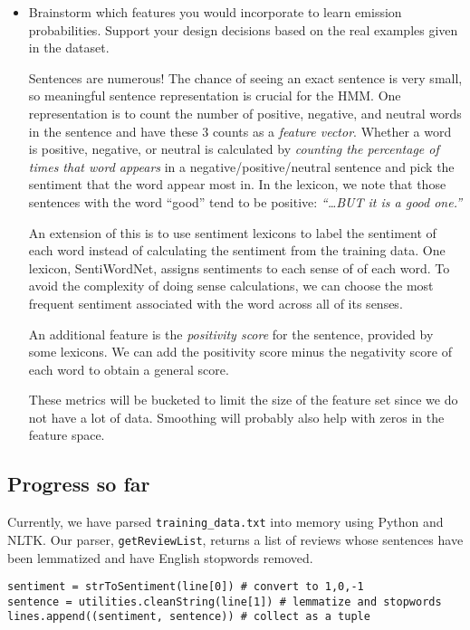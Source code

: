 \documentclass{article}
\begin{document}
\begin{itemize}
\item Brainstorm which features you would incorporate to learn emission probabilities. Support your design decisions based on the real examples given in the dataset.\par

Sentences are numerous! The chance of seeing an exact sentence is very small, so meaningful sentence representation is crucial for the HMM. One representation is to count the number of positive, negative, and neutral words in the sentence and have these 3 counts as a \emph{feature vector}. Whether a word is positive, negative, or neutral is calculated by \emph{counting the percentage of times that word appears} in a negative/positive/neutral sentence and pick the sentiment that the word appear most in. In the lexicon, we note that those sentences with the word ``good'' tend to be positive: \emph{``\ldots BUT it is a good one.''}

An extension of this is to use sentiment lexicons to label the sentiment of each word instead of calculating the sentiment from the training data. One lexicon, SentiWordNet, assigns sentiments to each sense of of each word. To avoid the complexity of doing sense calculations, we can choose the most frequent sentiment associated with the word across all of its senses.

An additional feature is the \emph{positivity score} for the sentence, provided by some lexicons. We can add the positivity score minus the negativity score of each word to obtain a general score.

These metrics will be bucketed to limit the size of the feature set since we do not have a lot of data. Smoothing will probably also help with zeros in the feature space.
\end{itemize}

\subsection*{Progress so far}
Currently, we have parsed \texttt{training\_data.txt} into memory using Python and NLTK. Our parser, \texttt{getReviewList}, returns a list of reviews whose sentences have been lemmatized and have English stopwords removed.

\begin{verbatim}
sentiment = strToSentiment(line[0]) # convert to 1,0,-1
sentence = utilities.cleanString(line[1]) # lemmatize and stopwords
lines.append((sentiment, sentence)) # collect as a tuple
\end{verbatim}
\end{document}

